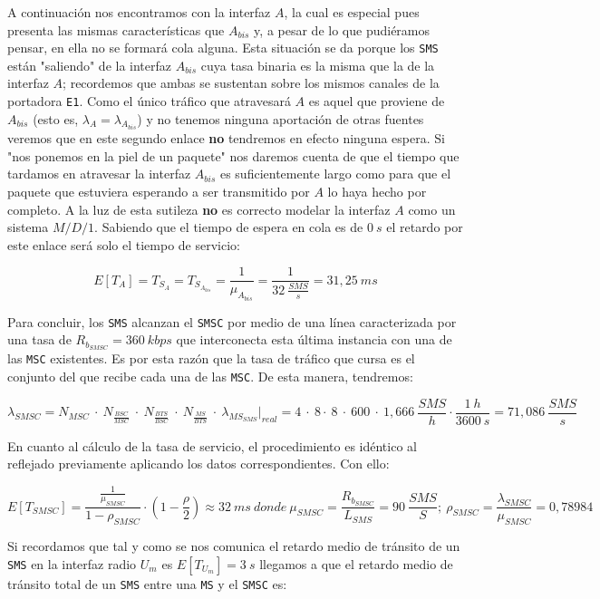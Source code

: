\documentclass[10pt]{article}
\begin{document}
			A continuación nos encontramos con la interfaz $A$, la cual es especial pues presenta las mismas características que $A_{bis}$ y, a pesar de lo que pudiéramos pensar, en ella no se formará cola alguna. Esta situación se da porque los \texttt{SMS} están "saliendo" de la interfaz $A_{bis}$ cuya tasa binaria es la misma que la de la interfaz $A$; recordemos que ambas se sustentan sobre los mismos canales de la portadora \texttt{E1}. Como el único tráfico que atravesará $A$ es aquel que proviene de $A_{bis}$ (esto es, $\lambda_A = \lambda_{A_{bis}}$) y no tenemos ninguna aportación de otras fuentes veremos que en este segundo enlace \textbf{no} tendremos en efecto ninguna espera. Si "nos ponemos en la piel de un paquete" nos daremos cuenta de que el tiempo que tardamos en atravesar la interfaz $A_{bis}$ es suficientemente largo como para que el paquete que estuviera esperando a ser transmitido por $A$ lo haya hecho por completo. A la luz de esta sutileza \textbf{no} es correcto modelar la interfaz $A$ como un sistema $M/D/1$. Sabiendo que el tiempo de espera en cola es de $0\ s$ el retardo por este enlace será solo el tiempo de servicio:
			
			$$E[T_A] = T_{S_A} = T_{S_{A_{bis}}} = \frac{1}{\mu_{A_{bis}}} = \frac{1}{32\ \frac{SMS}{s}} = 31,25\ ms$$

			Para concluir, los \texttt{SMS} alcanzan el \texttt{SMSC} por medio de una línea caracterizada por una tasa de $R_{b_{SMSC}} = 360\ kbps$ que interconecta esta última instancia con una de las \texttt{MSC} existentes. Es por esta razón que la tasa de tráfico que cursa es el conjunto del que recibe cada una de las \texttt{MSC}. De esta manera, tendremos:

			$$\lambda_{SMSC} = N_{MSC}\ \cdot\ N_{\frac{BSC}{MSC}}\ \cdot\ N_{\frac{BTS}{BSC}}\ \cdot\ N_{\frac{MS}{BTS}}\ \cdot\ \lambda_{MS_{SMS}}\biggr\rvert_{real} = 4\ \cdot\ 8\cdot\ 8\ \cdot\ 600\ \cdot\ 1,666\ \frac{SMS}{h} \cdot \frac{1\ h}{3600\ s} = 71,086\ \frac{SMS}{s}$$

			En cuanto al cálculo de la tasa de servicio, el procedimiento es idéntico al reflejado previamente aplicando los datos correspondientes. Con ello:

			$$E[T_{SMSC}] = \frac{\frac{1}{\mu_{SMSC}}}{1 - \rho_{SMSC}} \cdot (1 - \frac{\rho}{2}) \approx 32\ ms\ donde\ \mu_{SMSC} = \frac{R_{b_{SMSC}}}{L_{SMS}} = 90\ \frac{SMS}{S};\ \rho_{SMSC} = \frac{\lambda_{SMSC}}{\mu_{SMSC}} = 0,78984$$

			Si recordamos que tal y como se nos comunica el retardo medio de tránsito de un \texttt{SMS} en la interfaz radio $U_m$ es $E[T_{U_m}] = 3\ s$ llegamos a que el retardo medio de tránsito total de un \texttt{SMS} entre una \texttt{MS} y el \texttt{SMSC} es:
\end{document}

